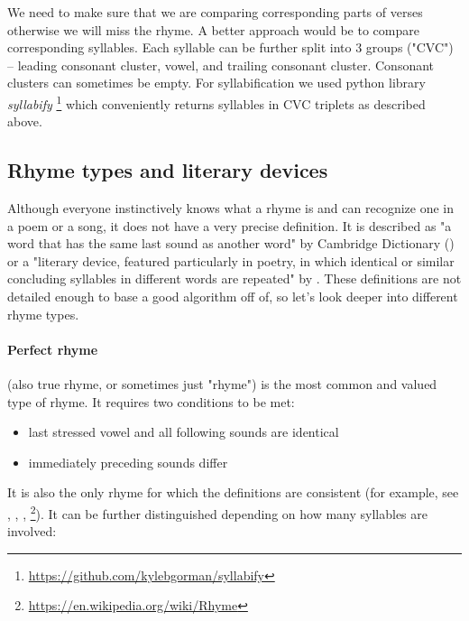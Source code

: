 We need to make sure that we are comparing corresponding parts of verses otherwise we will miss the rhyme. A better approach would be to compare corresponding syllables. Each syllable can be further split into 3 groups ("CVC") -- leading consonant cluster, vowel, and trailing consonant cluster. Consonant clusters can sometimes be empty. For syllabification we used python library \textit{syllabify} \footnote{\url{https://github.com/kylebgorman/syllabify}} which conveniently returns syllables in CVC triplets as described above.

\subsection{Rhyme types and literary devices}
Although everyone instinctively knows what a rhyme is and can recognize one in a poem or a song, it does not have a very precise definition. It is described as "a word that has the same last sound as another word" by Cambridge Dictionary (\cite{walter2008cambridge}) or a "literary device, featured particularly in poetry, in which identical or similar concluding syllables in different words are repeated" by \cite{literarydevices2020}. These definitions are not detailed enough to base a good algorithm off of, so let's look deeper into different rhyme types.

\paragraph{Perfect rhyme} (also true rhyme, or sometimes just "rhyme") is the most common and valued  type of rhyme. It requires two conditions to be met:

\begin{itemize}
	\item last stressed vowel and all following sounds are identical
	\item immediately preceding sounds differ
\end{itemize}

It is also the only rhyme for which the definitions are consistent (for example, see \cite{bain1867manual}, \cite{vanphonological}, \cite{bergman2017litcharts}, \footnote{\url{https://en.wikipedia.org/wiki/Rhyme}}). It can be further distinguished depending on how many syllables are involved:

